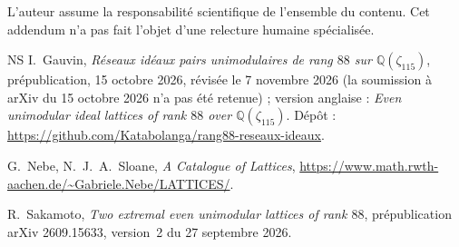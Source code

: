 \documentclass[11pt,a4paper]{amsart}
\theoremstyle{plain}
\theoremstyle{definition}
\newcommand{\Q}{\mathbb{Q}}
\begin{document}
L'auteur assume la responsabilité scientifique de l'ensemble du contenu. Cet addendum n'a pas fait l'objet d'une relecture humaine spécialisée.

\begin{thebibliography}{NS}
I.~Gauvin, \emph{Réseaux idéaux pairs unimodulaires de rang $88$ sur $\Q(\zeta_{115})$}, prépublication, 15 octobre 2026, révisée le 7 novembre 2026 (la soumission à arXiv du 15 octobre 2026 n'a pas été retenue) ; version anglaise : \emph{Even unimodular ideal lattices of rank $88$ over $\Q(\zeta_{115})$}. Dépôt : \url{https://github.com/Katabolanga/rang88-reseaux-ideaux}.

G.~Nebe, N.~J.~A.~Sloane, \emph{A Catalogue of Lattices}, \url{https://www.math.rwth-aachen.de/~Gabriele.Nebe/LATTICES/}.

R.~Sakamoto, \emph{Two extremal even unimodular lattices of rank $88$}, prépublication arXiv 2609.15633, version~2 du 27 septembre 2026.
\end{thebibliography}
\end{document}
